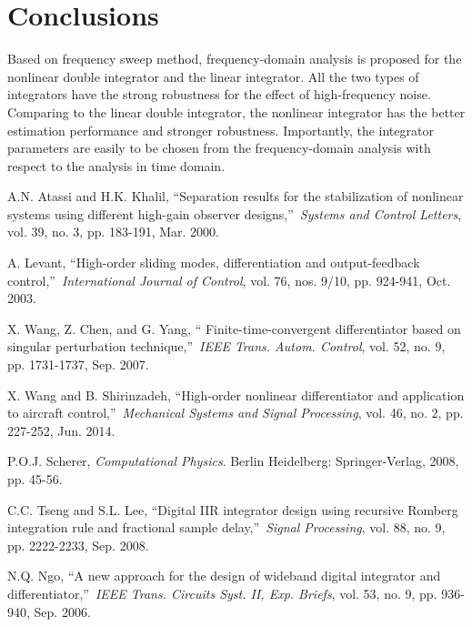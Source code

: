 \documentclass[10pt,journal]{IEEEtran}
\begin{document}
\section{Conclusions}

Based on frequency sweep method, frequency-domain analysis is proposed for
the nonlinear double integrator and the linear integrator. All the two types
of integrators have the strong robustness for the effect of high-frequency
noise. Comparing to the linear double integrator, the nonlinear integrator
has the better estimation performance and stronger robustness. Importantly,
the integrator parameters are easily to be chosen from the frequency-domain
analysis with respect to the analysis in time domain.

\begin{thebibliography}{99}
\bibitem{} A.N. Atassi and H.K. Khalil, \textquotedblleft Separation results
for the stabilization of nonlinear systems using different high-gain
observer designs,\textquotedblright\ \emph{Systems and Control Letters},
vol. 39, no. 3, pp. 183-191, Mar. 2000.

\bibitem{} A. Levant, \textquotedblleft High-order sliding modes,
differentiation and output-feedback control,\textquotedblright\ \emph{International Journal of Control}, vol. 76, nos. 9/10, pp. 924-941, Oct.
2003.

\bibitem{} X. Wang, Z. Chen, and G. Yang, \textquotedblleft
Finite-time-convergent differentiator based on singular perturbation
technique,\textquotedblright\ \emph{IEEE Trans. Autom. Control}, vol. 52,
no. 9, pp. 1731-1737, Sep. 2007.

\bibitem{} X. Wang and B. Shirinzadeh, \textquotedblleft High-order
nonlinear differentiator and application to aircraft
control,\textquotedblright\ \emph{Mechanical Systems and Signal Processing},
vol. 46, no. 2, pp. 227-252, Jun. 2014.

\bibitem{} P.O.J. Scherer, \emph{Computational Physics}. Berlin Heidelberg:
Springer-Verlag, 2008, pp. 45-56.

\bibitem{} C.C. Tseng and S.L. Lee, \textquotedblleft Digital IIR integrator
design using recursive Romberg integration rule and fractional sample
delay,\textquotedblright\ \emph{Signal Processing}, vol. 88, no. 9, pp.
2222-2233, Sep. 2008.

\bibitem{} N.Q. Ngo, \textquotedblleft A new approach for the design of
wideband digital integrator and differentiator,\textquotedblright\ \emph{IEEE Trans. Circuits Syst. II, Exp. Briefs}, vol. 53, no. 9, pp. 936-940,
Sep. 2006.


\end{thebibliography}
\end{document}
